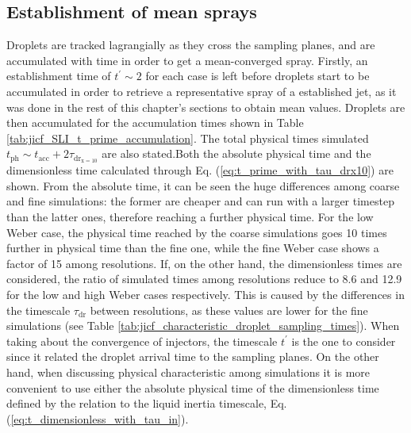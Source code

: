 \subsection{Establishment of mean sprays}

Droplets are tracked lagrangially as they cross the sampling planes, and are accumulated with time in order to get a mean-converged spray. Firstly, an establishment time of $t^{\prime} \sim 2$ for each case is left before droplets start to be accumulated in order to retrieve a representative spray of a established jet, as it was done in the rest of this chapter's sections to obtain mean values. Droplets are then accumulated for the accumulation times shown in Table \ref{tab:jicf_SLI_t_prime_accumulation}. The total physical times simulated $t_\mathrm{ph} \sim t_\mathrm{acc} + 2 \tau_\mathrm{dr_{x=10}}$ are also stated.Both the absolute physical time and the dimensionless time calculated through Eq. (\ref{eq:t_prime_with_tau_drx10}) are shown. From the absolute time, it can be seen the huge differences among coarse and fine simulations: the former are cheaper and can run with a larger timestep than the latter ones, therefore reaching a further physical time. For the low Weber case, the physical time reached by the coarse simulations goes 10 times further in physical time than the fine one, while the fine Weber case shows a factor of 15 among resolutions. If, on the other hand, the dimensionless times are considered, the ratio of simulated times among resolutions reduce to 8.6 and 12.9 for the low and high Weber cases respectively. This is caused by the differences in the timescale $\tau_\mathrm{dr}$ between resolutions, as these values are lower for the fine simulations (see Table \ref{tab:jicf_characteristic_droplet_sampling_times}). When taking about the convergence of injectors, the timescale $t^{\prime}$ is the one to consider since it related the droplet arrival time to the sampling planes. On the other hand, when discussing physical characteristic among simulations it is more convenient to use either the absolute physical time of the dimensionless time defined by the relation to the liquid inertia timescale, Eq. (\ref{eq:t_dimensionless_with_tau_in}).


